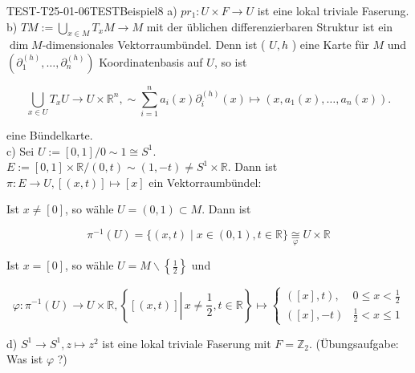 
\begin{EXA}{TEST-T25-01-06}{TESTBeispiel8}
a) $p r_{1}: U \times F \rightarrow U$ ist eine lokal triviale Faserung.\\
b) $T M:=\bigcup_{x \in M} T_{x} M \rightarrow M$ mit der üblichen differenzierbaren Struktur ist ein $\operatorname{dim} M$-dimensionales Vektorraumbündel. Denn ist ( $U, h$ ) eine Karte für $M$ und $\left(\partial_{1}^{(h)}, \ldots, \partial_{n}^{(h)}\right)$ Koordinatenbasis auf $U$, so ist

$$
\bigcup_{x \in U} T_{x} U \rightarrow U \times \mathbb{R}^{n}, \sim \sum_{i=1}^{n} a_{i}(x) \partial_{i}^{(h)}(x) \mapsto\left(x, a_{1}(x), \ldots, a_{n}(x)\right) .
$$

eine Bündelkarte.\\
c) Sei $U:=[0,1] / 0 \sim 1 \cong S^{1}$.\\
$E:=[0,1] \times \mathbb{R} /(0, t) \sim(1,-t) \neq S^{1} \times \mathbb{R}$. Dann ist $\pi: E \rightarrow U,[(x, t)] \mapsto[x]$ ein Vektorraumbündel:

Ist $x \neq[0]$, so wähle $U=(0,1) \subset M$. Dann ist

$$
\pi^{-1}(U)=\{(x, t) \mid x \in(0,1), t \in \mathbb{R}\} \underset{\varphi}{\cong} U \times \mathbb{R}
$$

Ist $x=[0]$, so wähle $U=M \backslash\left\{\frac{1}{2}\right\}$ und

$$
\varphi: \pi^{-1}(U) \rightarrow U \times \mathbb{R},\left\{[(x, t)] \left\lvert\, x \neq \frac{1}{2}\right., t \in \mathbb{R}\right\} \mapsto \begin{cases}([x], t), & 0 \leq x<\frac{1}{2} \\ ([x],-t) & \frac{1}{2}<x \leq 1\end{cases}
$$

d) $S^{1} \rightarrow S^{1}, z \mapsto z^{2}$ ist eine lokal triviale Faserung mit $F=\mathbb{Z}_{2}$. (Übungsaufgabe: Was ist $\varphi$ ?)
\end{EXA}
